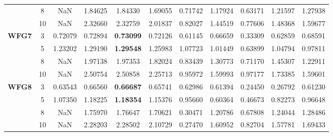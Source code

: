 \documentclass[conference]{IEEEtran}
\begin{document}
\begin{table*}[!htb]
\begin{tabular}{|c|c|c|c|c|c|c|c|c|c|c|}
		& 8          & NaN              & 1.84625           & 1.84330               & 1.69055          & 0.71742             & 1.17924             & 0.63171            & 1.21597              & 1.27938          \\ \cline{2-11} 
		& 10         & NaN              & 2.32660           & 2.32759               & 2.01837          & 0.82027             & 1.44519             & 0.77606            & 1.48368              & 1.59677          \\ \hline
		\multirow{4}{*}{\textbf{WFG7}}  & 3          & 0.72079          & 0.72894           & \textbf{0.73099}      & 0.72126          & 0.61145             & 0.66659             & 0.33309            & 0.62859              & 0.68591          \\ \cline{2-11} 
		& 5          & 1.23202          & 1.29190           & \textbf{1.29548}      & 1.25983          & 1.07723             & 1.01449             & 0.63899            & 1.04794              & 0.97811          \\ \cline{2-11} 
		& 8          & NaN              & 1.97138           & 1.97353               & 1.82024          & 0.83439             & 1.30773             & 0.71170            & 1.45307              & 1.22911          \\ \cline{2-11} 
		& 10         & NaN              & 2.50754           & 2.50858               & 2.25713          & 0.95972             & 1.59993             & 0.97177            & 1.73385              & 1.59601          \\ \hline
		\multirow{4}{*}{\textbf{WFG8}}  & 3          & 0.63543          & 0.66560           & \textbf{0.66687}      & 0.65741          & 0.62986             & 0.61394             & 0.24450            & 0.26792              & 0.61230          \\ \cline{2-11} 
		& 5          & 1.07350          & 1.18225           & \textbf{1.18354}      & 1.15376          & 0.95660             & 0.60364             & 0.46673            & 0.82273              & 0.96648          \\ \cline{2-11} 
		& 8          & NaN              & 1.75970           & 1.76647               & 1.70621          & 0.30471             & 1.20786             & 0.67808            & 1.24044              & 1.28486          \\ \cline{2-11} 
		& 10         & NaN              & 2.28203           & 2.28502               & 2.10729          & 0.27470             & 1.60952             & 0.82704            & 1.57781              & 1.69433          \\ \hline

\end{tabular}
\end{table*}
\end{document}

